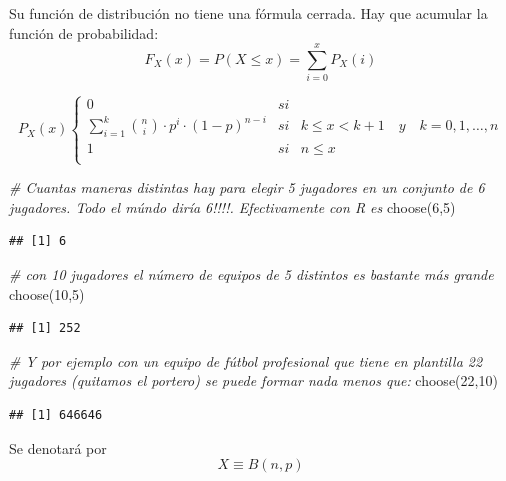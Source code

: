 \documentclass[
]{article}
\newenvironment{Shaded}{\begin{snugshade}}{\end{snugshade}}
\newcommand{\CommentTok}[1]{\textcolor[rgb]{0.56,0.35,0.01}{\textit{#1}}}
\newcommand{\DecValTok}[1]{\textcolor[rgb]{0.00,0.00,0.81}{#1}}
\newcommand{\FunctionTok}[1]{\textcolor[rgb]{0.00,0.00,0.00}{#1}}
\newcommand{\NormalTok}[1]{#1}
\begin{document}
Su función de distribución no tiene una fórmula cerrada. Hay que
acumular la función de probabilidad:
\[F_X(x) = P(X\leq x) = \sum_{i=0}^x P_X(i)\]

\[P_X(x)\left\{\begin{array}{rcl}
  0&si&\\
  \sum_{i=1}^k {n \choose i} \cdot p^i \cdot (1-p)^{n-i}&si&k\leq x < k+1 \quad y \quad k=0,1,\ldots, n\\
  1&si&n\leq x\\
\end{array}\right.\]

\begin{Shaded}
\begin{Highlighting}[]
\CommentTok{\# Cuantas maneras distintas hay para elegir 5 jugadores en un conjunto de 6 jugadores. Todo el múndo diría 6!!!!. Efectivamente con R es}
\FunctionTok{choose}\NormalTok{(}\DecValTok{6}\NormalTok{,}\DecValTok{5}\NormalTok{)}
\end{Highlighting}
\end{Shaded}

\begin{verbatim}
## [1] 6
\end{verbatim}

\begin{Shaded}
\begin{Highlighting}[]
\CommentTok{\# con 10 jugadores el número de equipos de 5 distintos es bastante más grande}
\FunctionTok{choose}\NormalTok{(}\DecValTok{10}\NormalTok{,}\DecValTok{5}\NormalTok{)}
\end{Highlighting}
\end{Shaded}

\begin{verbatim}
## [1] 252
\end{verbatim}

\begin{Shaded}
\begin{Highlighting}[]
\CommentTok{\# Y por ejemplo con un equipo de fútbol profesional que tiene en plantilla 22 jugadores (quitamos el portero) se puede formar nada menos que:}
\FunctionTok{choose}\NormalTok{(}\DecValTok{22}\NormalTok{,}\DecValTok{10}\NormalTok{)}
\end{Highlighting}
\end{Shaded}

\begin{verbatim}
## [1] 646646
\end{verbatim}

Se denotará por \[X\equiv B(n,p)\]
\end{document}
